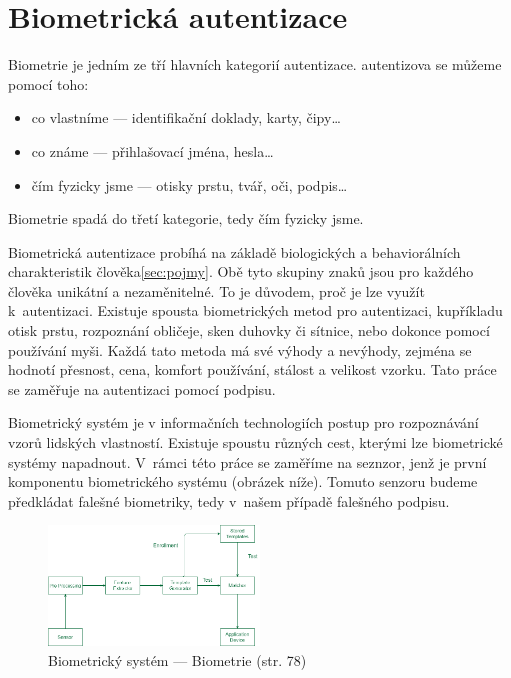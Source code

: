 \section{Biometrická autentizace}
Biometrie je jedním ze tří hlavních kategorií autentizace.
autentizova se můžeme pomocí toho:

\begin{itemize}
  \item co vlastníme --- identifikační doklady, karty, čipy\ldots   %
  \item co známe --- přihlašovací jména, hesla\ldots                %
  \item čím fyzicky jsme --- otisky prstu, tvář, oči, podpis\ldots  %
\end{itemize}                                                   %
Biometrie spadá do třetí kategorie, tedy čím fyzicky jsme. 

Biometrická autentizace probíhá na základě biologických a behaviorálních charakteristik člověka\ref{sec:pojmy}. 
Obě tyto skupiny znaků jsou pro každého člověka unikátní a nezaměnitelné. To je důvodem, proč je lze využít k~autentizaci.
Existuje spousta biometrických metod pro autentizaci, kupříkladu otisk prstu, rozpoznání obličeje, sken duhovky či sítnice, nebo dokonce pomocí používání myši. 
Každá tato metoda má své výhody a nevýhody, zejména se hodnotí přesnost, cena, komfort používání, stálost a velikost vzorku. %
Tato práce se zaměřuje na autentizaci pomocí podpisu.

Biometrický systém je v informačních technologiích postup pro rozpoznávání vzorů lidských vlastností.       %
Existuje spoustu různých cest, kterými lze biometrické systémy napadnout.                                   %
V~rámci této práce se zaměříme na seznzor, jenž je první komponentu biometrického systému (obrázek níže).   %
Tomuto senzoru budeme předkládat falešné biometriky, tedy v~našem případě falešného podpisu.                %

\begin{figure}[h]
  \centering
  \includegraphics[width=0.5\textwidth]{obrazky-figures/biometricky_system.png}
  \caption{Biometrický systém --- Biometrie (str. 78)} %
  \label{fig:biometricky_system}
\end{figure}


